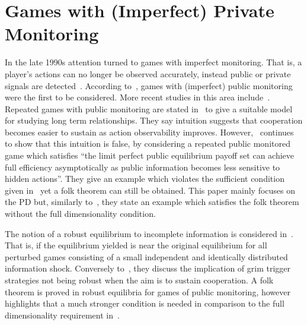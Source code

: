 \section{Games with (Imperfect) Private Monitoring}\label{sec:Games_with_(Imperfect)_Private_Monitoring}
In the late 1990s attention turned to games with imperfect monitoring. That is,
a player's actions can no longer be observed accurately, instead public or
private signals are detected~\cite{Durlauf2016}. According to~\cite{Matsushima2004}, games with (imperfect) public
monitoring were the first to be considered. More recent
studies in this area include~\cite{Chassang2011,Kandori2006}.
Repeated games with public monitoring are stated
in~\cite{Kandori2006} to give a
suitable model for studying long term relationships. They say intuition
suggests that cooperation becomes easier to sustain as action observability
improves. However,~\cite{Kandori2006} continues to show that this intuition is
false, by considering a repeated public monitored game which satisfies ``the
limit perfect public equilibrium payoff set can achieve full efficiency
asymptotically as public information becomes less sensitive to hidden actions''.
They give an example which violates the sufficient condition given
in~\cite{Fudenberg_1994} yet a folk theorem can still be obtained. This paper mainly
focuses on
the PD but, similarly to~\cite{Abreu1994}, they state an example
which satisfies the folk theorem without the full dimensionality condition. 

The notion of a robust equilibrium to incomplete
information is considered in~\cite{Chassang2011}. That is, if the equilibrium
yielded is near the original equilibrium for all perturbed games consisting of a
small independent and identically distributed information shock. Conversely to~\cite{Friedman1971},
they discuss the implication of grim trigger strategies not being robust when
the aim is to sustain cooperation. A folk theorem is proved in robust equilibria
for games of public monitoring, however~\cite{Chassang2011} highlights that a
much stronger condition is needed in comparison to the full dimensionality
requirement in~\cite{Fudenberg_1994}.

